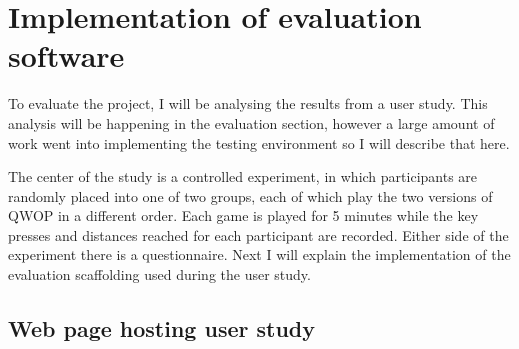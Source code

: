 \documentclass[12pt,a4paper,twoside,openright]{report}
\begin{document}
\section{Implementation of evaluation software}
\label{studyimpl}

To evaluate the project, I will be analysing the results from a user study. This analysis will be happening in the evaluation section, however a large amount of work went into implementing the testing environment so I will describe that here.

The center of the study is a controlled experiment, in which participants are randomly placed into one of two groups, each of which play the two versions of QWOP in a different order.
Each game is played for 5 minutes while the key presses and distances reached for each participant are recorded.
Either side of the experiment there is a questionnaire.
Next I will explain the implementation of the evaluation scaffolding used during the user study.



\subsection{Web page hosting user study}
\label{sec:webPage}
\end{document}
